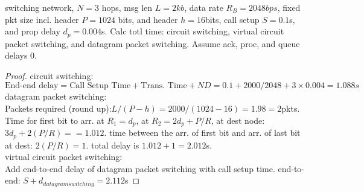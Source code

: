 \documentclass[./answersheet.tex]{subfiles}
\begin{document}
\begin{wts}
    switching network, $N=3$ hops, msg len $L=2kb$, data rate $R_B = 2048bps$, fixed pkt size incl. header $P=1024$ bits, and header $h=16$bits, call setup $S=0.1$s, and prop delay $d_p=0.004$s. Calc totl time: circuit switching, virtual circuit packet switching, and datagram packet switching. Assume ack, proc, and queue delays $0$.
\end{wts}
\begin{proof}
    circuit switching:\\
    $\text{End-end delay} = \text{Call Setup Time} + \text{Trans. Time} +ND= 0.1+2000/2048 + 3\times0.004=1.088s$\\
    datagram packet switching:\\
    Packets required (round up):$L/(P-h)=2000/(1024-16)=1.98=2$pkts. Time for first bit to arr. at $R_1=d_p$, at $R_2=2d_p + P/R$, at dest node: $3d_p + 2(P/R)==1.012$. time between the arr. of first bit and arr. of last bit at dest: $2(P/R)=1$. total delay is $1.012+1=2.012$s.\\
    virtual circuit packet switching:\\
    Add end-to-end delay of datagram packet switching with call setup time. end-to-end: $S + d_{datagram switching}=2.112$s
\end{proof}
\end{document}
